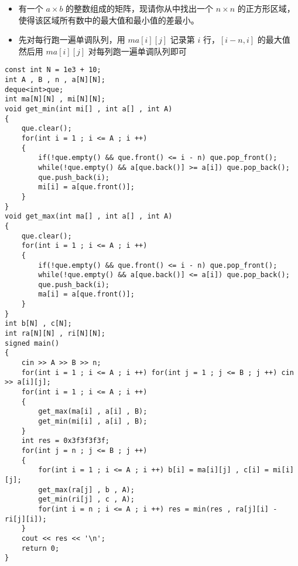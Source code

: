 \documentclass[E:/GsjzTle/main/main.tex]{subfiles}
\begin{document}
\begin{itemize}
\item
  有一个 \(a \times b\) 的整数组成的矩阵，现请你从中找出一个
  \(n\times n\)
  的正方形区域，使得该区域所有数中的最大值和最小值的差最小。
\item
  先对每行跑一遍单调队列，用 \(ma[i][j]\) 记录第 \(i\) 行，\([i-n,i]\)
  的最大值\\
  然后用 \(ma[i][j]\) 对每列跑一遍单调队列即可
\end{itemize}

\begin{lstlisting}
const int N = 1e3 + 10;
int A , B , n , a[N][N];
deque<int>que;
int ma[N][N] , mi[N][N];
void get_min(int mi[] , int a[] , int A)
{
	que.clear();
	for(int i = 1 ; i <= A ; i ++)
	{
		if(!que.empty() && que.front() <= i - n) que.pop_front();
		while(!que.empty() && a[que.back()] >= a[i]) que.pop_back();
		que.push_back(i);
		mi[i] = a[que.front()];
	}
}
void get_max(int ma[] , int a[] , int A)
{
	que.clear();
	for(int i = 1 ; i <= A ; i ++)
	{
		if(!que.empty() && que.front() <= i - n) que.pop_front();
		while(!que.empty() && a[que.back()] <= a[i]) que.pop_back();
		que.push_back(i);
		ma[i] = a[que.front()];
	}
}
int b[N] , c[N];
int ra[N][N] , ri[N][N]; 
signed main()
{
	cin >> A >> B >> n; 
	for(int i = 1 ; i <= A ; i ++) for(int j = 1 ; j <= B ; j ++) cin >> a[i][j];
	for(int i = 1 ; i <= A ; i ++)
	{
		get_max(ma[i] , a[i] , B);
		get_min(mi[i] , a[i] , B); 
	}
	int res = 0x3f3f3f3f;
	for(int j = n ; j <= B ; j ++)
	{
		for(int i = 1 ; i <= A ; i ++) b[i] = ma[i][j] , c[i] = mi[i][j];
		get_max(ra[j] , b , A);
		get_min(ri[j] , c , A);
		for(int i = n ; i <= A ; i ++) res = min(res , ra[j][i] - ri[j][i]);
	}
	cout << res << '\n';
	return 0;
}
\end{lstlisting}
\end{document}
